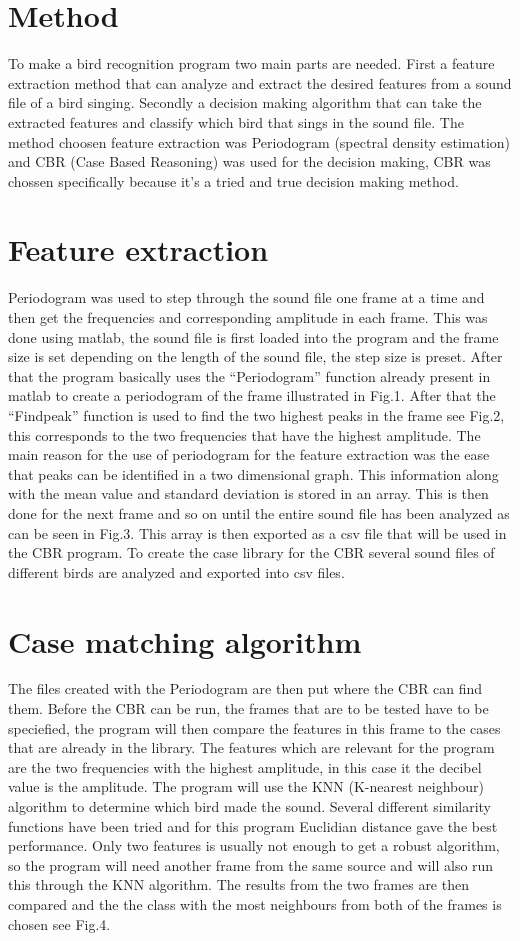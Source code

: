 \section{Method}
To make a bird recognition program two main parts are needed. First a feature
extraction method that can analyze and extract the desired features from a
sound file of a bird singing. Secondly a decision making algorithm that can
take the extracted features and classify which bird that sings in the sound
file. The method choosen feature extraction was Periodogram (spectral density
estimation) and CBR (Case Based Reasoning) was used for the decision making,
CBR was chossen specifically because it’s a tried and true decision making method.

\section{Feature extraction}
Periodogram was used to step through the sound file one frame at a time and
then get the frequencies and corresponding amplitude in each frame. This was
done using matlab, the sound file is first loaded into the program and the
frame size is set depending on the length of the sound file, the step size
is preset. After that the program basically uses the “Periodogram” function
already present in matlab to create a periodogram of the frame illustrated in
Fig.1. After that the “Findpeak” function is used to find the two highest
peaks in the frame see Fig.2, this corresponds to the two frequencies that have
the highest amplitude. The main reason for the use of periodogram for the
feature extraction was the ease that peaks can be identified in a two
dimensional graph. This information along with the mean value and standard
deviation is stored in an array. This is then done for the next frame and
so on until the entire sound file has been analyzed as can be seen in Fig.3.
This array is then exported as a csv file that will be used in the CBR program.
To create the case library for the CBR several sound files of different birds
are analyzed and exported into csv files.

\section{Case matching algorithm}
The files created with the Periodogram are then put where the CBR can find them.
Before the CBR can be run, the frames that are to be tested have to be
speciefied, the program will then compare the features in this frame to the
cases that are already in the library. The features which are relevant for
the program are the two frequencies with the highest amplitude, in this case
it the decibel value is the amplitude. The program will use the KNN
(K-nearest neighbour) algorithm to determine which bird made the sound.
Several different similarity functions have been tried and for this program
Euclidian distance gave the best performance. Only two features is usually
not enough to get a robust algorithm, so the program will need another frame
from the same source and will also run this through the KNN algorithm. The
results from the two frames are then compared and the the class with the most
neighbours from both of the frames is chosen see Fig.4.
